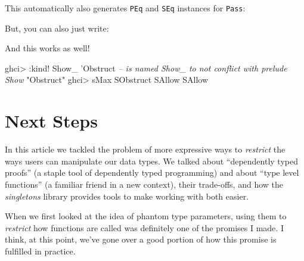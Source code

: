 \documentclass[]{article}
\newenvironment{Shaded}{}{}
\newcommand{\CommentTok}[1]{\textcolor[rgb]{0.38,0.63,0.69}{\textit{#1}}}
\newcommand{\DataTypeTok}[1]{\textcolor[rgb]{0.56,0.13,0.00}{#1}}
\newcommand{\FunctionTok}[1]{\textcolor[rgb]{0.02,0.16,0.49}{#1}}
\newcommand{\NormalTok}[1]{#1}
\newcommand{\StringTok}[1]{\textcolor[rgb]{0.25,0.44,0.63}{#1}}
\begin{document}
This automatically also generates \texttt{PEq} and \texttt{SEq} instances for
\texttt{Pass}:

\begin{Shaded}
\end{Shaded}

But, you can also just write:

\begin{Shaded}
\end{Shaded}

And this works as well!

\begin{Shaded}
\begin{Highlighting}[]
\NormalTok{ghci}\FunctionTok{>} \FunctionTok{:}\NormalTok{kind}\FunctionTok{!} \DataTypeTok{Show_}\NormalTok{ '}\DataTypeTok{Obstruct}      \CommentTok{-- is named Show_ to not conflict with prelude Show}
\StringTok{"Obstruct"}
\NormalTok{ghci}\FunctionTok{>}\NormalTok{ sMax }\DataTypeTok{SObstruct} \DataTypeTok{SAllow}
\DataTypeTok{SAllow}
\end{Highlighting}
\end{Shaded}

\hypertarget{next-steps}{%
\section{Next Steps}\label{next-steps}}

In this article we tackled the problem of more expressive ways to
\emph{restrict} the ways users can manipulate our data types. We talked about
``dependently typed proofs'' (a staple tool of dependently typed programming)
and about ``type level functions'' (a familiar friend in a new context), their
trade-offs, and how the \emph{singletons} library provides tools to make working
with both easier.

When we first looked at the idea of phantom type parameters, using them to
\emph{restrict} how functions are called was definitely one of the promises I
made. I think, at this point, we've gone over a good portion of how this promise
is fulfilled in practice.
\end{document}
